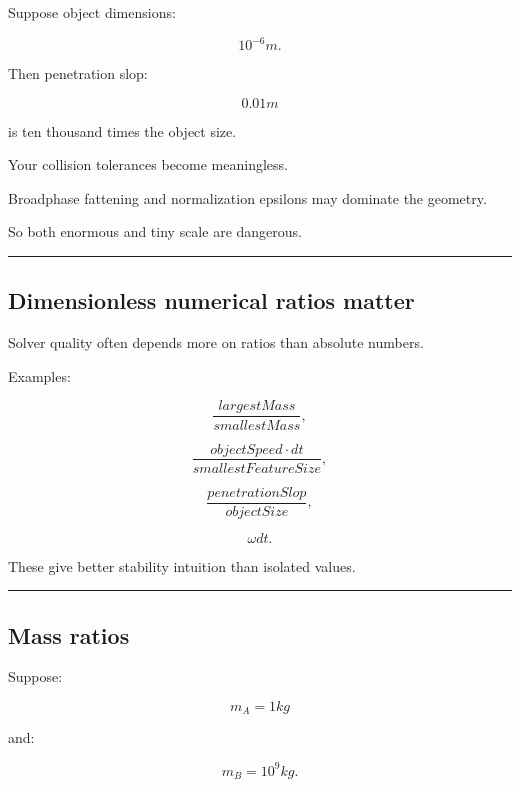 \hypertarget{06-engine-ii-ch039-extremely-tiny-objects-are-also-problematic}{}

Suppose object dimensions:

\[
10^{-6}m.
\]

Then penetration slop:

\[
0.01m
\]

is ten thousand times the object size.

Your collision tolerances become meaningless.

Broadphase fattening and normalization epsilons may dominate the geometry.

So both enormous and tiny scale are dangerous.

\begin{center}\rule{0.5\linewidth}{0.5pt}\end{center}

\subsection{Dimensionless numerical ratios matter}\label{06-engine-ii-ch039-dimensionless-numerical-ratios-matter}

\hypertarget{06-engine-ii-ch039-dimensionless-numerical-ratios-matter}{}

Solver quality often depends more on ratios than absolute numbers.

Examples:

\[
\frac{largestMass}{smallestMass},
\]

\[
\frac{objectSpeed\cdot dt}{smallestFeatureSize},
\]

\[
\frac{penetrationSlop}{objectSize},
\]

\[
\omega dt.
\]

These give better stability intuition than isolated values.

\begin{center}\rule{0.5\linewidth}{0.5pt}\end{center}

\subsection{Mass ratios}\label{06-engine-ii-ch039-mass-ratios}

\hypertarget{06-engine-ii-ch039-mass-ratios}{}

Suppose:

\[
m_A=1kg
\]

and:

\[
m_B=10^9kg.
\]

